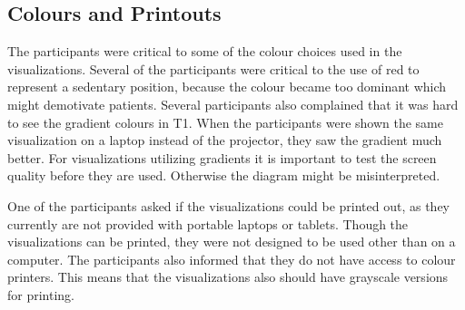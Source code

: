 \subsection{Colours and Printouts}
The participants were critical to some of the colour choices used in the visualizations. Several of the participants were critical to the use of red to represent a sedentary position, because the colour became too dominant which might demotivate patients. Several participants also complained that it was hard to see the gradient colours in T1. When the participants were shown the same visualization on a laptop instead of the projector, they saw the gradient much better. For visualizations utilizing gradients it is important to test the screen quality before they are used. Otherwise the diagram might be misinterpreted. 

One of the participants asked if the visualizations could be printed out, as they currently are not provided with portable laptops or tablets. Though the visualizations can be printed, they were not designed to be used other than on a computer. The participants also informed that they do not have access to colour printers. This means that the visualizations also should have grayscale versions for printing. 
